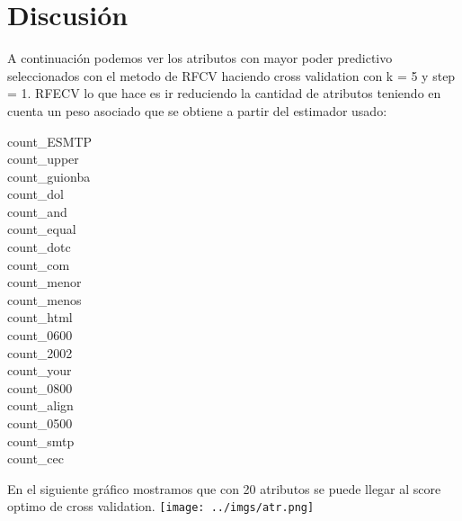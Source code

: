 \documentclass[10pt, a4paper]{article}
\begin{document}
% 
 
\section{Discusión}
 
 A continuación podemos ver los atributos con mayor poder predictivo seleccionados con el metodo de RFCV haciendo cross validation con k = 5 y step = 1. RFECV lo que hace es ir reduciendo la cantidad de atributos teniendo en cuenta un peso asociado que se obtiene a partir del estimador usado:

\begin{description}
\item [count_ESMTP]
\item [count_upper]
\item [count_guionba]
\item [count_dol
\item [count_arr]
\item [count_and]
\item [count_equal]
\item [count_dotc]
\item [count_com]
\item [count_menor]
\item [count_menos]
\item [count_html]
\item [count_0600]
\item [count_2002]
\item [count_your]
\item [count_0800]
\item [count_align]
\item [count_0500]
\item [count_smtp]
\item [count_cec]
\end{description}


En el siguiente gráfico mostramos que con 20 atributos se puede llegar al score optimo de cross validation.
\texttt{[image: ../imgs/atr.png]}


\end{document}

